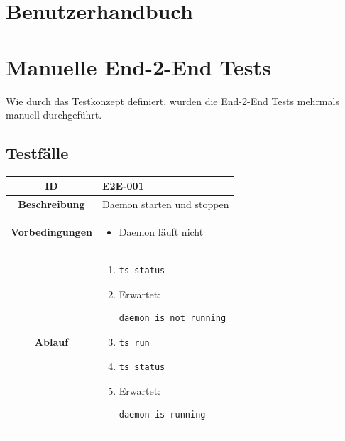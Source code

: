 \documentclass[a4paper,12pt]{report}
\begin{document}
    \section{Benutzerhandbuch}


    \section{Manuelle End-2-End Tests}
    Wie durch das Testkonzept definiert, wurden die End-2-End Tests mehrmals manuell durchgeführt.

    \subsection{Testfälle}

    \begin{table}[h!]
        \centering
        \setlength{\leftmargini}{0.8cm}
        \begin{tabular}{|c|p{10cm}|}
            \hline
            \textbf{ID}                  & E2E-001                                    \\ \hline
            \textbf{Beschreibung}        & Daemon starten und stoppen                 \\ \hline
            \textbf{Vorbedingungen} &
            \begin{itemize}
                \item Daemon läuft nicht
            \end{itemize} \\ \hline
            \textbf{Ablauf} &
            \begin{enumerate}
                \item \begin{verbatim}ts status
                \end{verbatim}
                \item Erwartet: \begin{verbatim}daemon is not running
                \end{verbatim}
                \item \begin{verbatim}ts run
                \end{verbatim}
                \item \begin{verbatim}ts status
                \end{verbatim}
                \item Erwartet: \begin{verbatim}daemon is running

\end{verbatim}
\end{enumerate}
\end{tabular}
\end{table}
\end{document}
